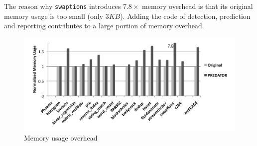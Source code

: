The reason why \texttt{swaptions} introduces $7.8\times$ memory overhead is that 
its original memory usage is too small (only $3KB$).
Adding the code of detection, prediction and
reporting contributes to a large portion of memory overhead. 

\begin{figure}
\begin{center} 
\includegraphics[width=6.5in]{fig/memusage}
\end{center}
\caption{Memory usage overhead}
\label{fig:memusage}
\end{figure}


